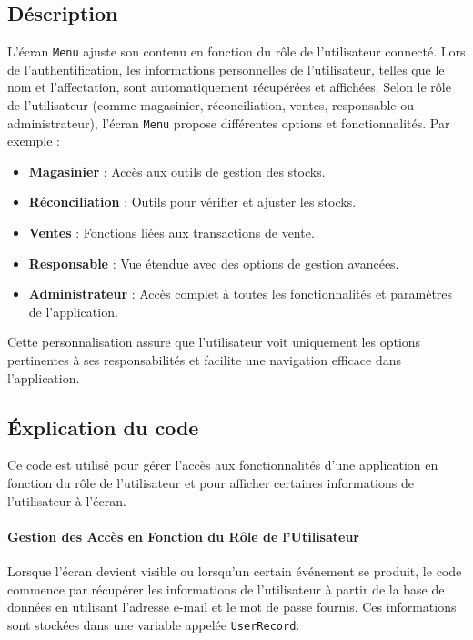 \documentclass[a4paper, oneside, 12pt, final]{extreport}
\begin{document}
\subsection{Déscription}
L'écran \texttt{Menu} ajuste son contenu en fonction du rôle de l'utilisateur connecté. Lors de l'authentification, les informations personnelles de l'utilisateur, telles que le nom et l'affectation, sont automatiquement récupérées et affichées. Selon le rôle de l'utilisateur (comme magasinier, réconciliation, ventes, responsable ou administrateur), l'écran \texttt{Menu} propose différentes options et fonctionnalités. Par exemple :

\begin{itemize}
    \item \textbf{Magasinier} : Accès aux outils de gestion des stocks.
    \item \textbf{Réconciliation} : Outils pour vérifier et ajuster les stocks.
    \item \textbf{Ventes} : Fonctions liées aux transactions de vente.
    \item \textbf{Responsable} : Vue étendue avec des options de gestion avancées.
    \item \textbf{Administrateur} : Accès complet à toutes les fonctionnalités et paramètres de l'application.
\end{itemize}

Cette personnalisation assure que l'utilisateur voit uniquement les options pertinentes à ses responsabilités et facilite une navigation efficace dans l'application.

\subsection{Éxplication du code}
Ce code est utilisé pour gérer l'accès aux fonctionnalités d'une application en fonction du rôle de l'utilisateur et pour afficher certaines informations de l'utilisateur à l'écran.

\paragraph{Gestion des Accès en Fonction du Rôle de l'Utilisateur}
Lorsque l'écran devient visible ou lorsqu'un certain événement se produit, le code commence par récupérer les informations de l'utilisateur à partir de la base de données en utilisant l'adresse e-mail et le mot de passe fournis. Ces informations sont stockées dans une variable appelée \texttt{UserRecord}.
\end{document}
